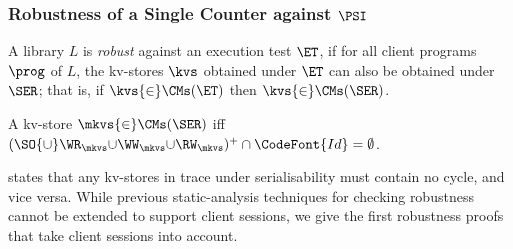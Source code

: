 

\subsubsection{Robustness of a Single Counter against $\PSI$}

A library $L$ is \emph{robust} against an execution test $\ET$,
if for all client programs \( \prog \) of $L$, 
the kv-stores \( \kvs \) obtained under $\ET$ can also be obtained under $\SER$;
that is, if \( \kvs {\in} \CMs(\ET) \) then \( \kvs {\in} \CMs(\SER) \).

\spaceshrink{-2pt}
\begin{theorem}
\label{thm:serialisable_nocycle}
A kv-store $\mkvs {\in} \CMs(\SER)$ iff $(\SO {\cup} \WR_{\mkvs} 
{\cup} \WW_{\mkvs} {\cup} \RW_{\mkvs})^{+} \cap \CodeFont{Id} = \emptyset$.%
\end{theorem}
\spaceshrink{-2pt}

\noindent
{} states that any kv-stores in trace under serialisability must contain no cycle, and vice versa.
While previous static-analysis techniques for checking robustness \citep{giovanni_concur16,SIanalysis,laws,sureshConcur}
cannot be extended to support client sessions, 
we give the first robustness proofs that take client sessions into account.

